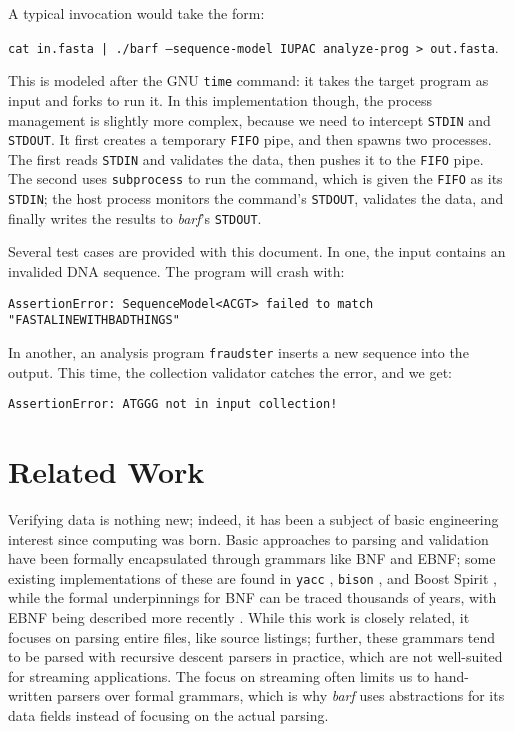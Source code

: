\documentclass[12pt]{article} %
\newcommand{\code}[1]{\texttt{#1}}
\begin{document}
A typical invocation would take the form:

\begin{center}
\code{cat in.fasta | ./barf --sequence-model IUPAC analyze-prog > out.fasta}.
\end{center}

This is modeled after the GNU \texttt{time} command: it takes the target program
as input and forks to run it. In this implementation though, the process management
is slightly more complex, because we need to intercept \texttt{STDIN} and
\texttt{STDOUT}. It first creates a temporary \texttt{FIFO} pipe, and then spawns
two processes. The first reads \texttt{STDIN} and validates the data, then pushes it
to the \texttt{FIFO} pipe. The second uses \texttt{subprocess} to run the command,
which is given the \texttt{FIFO} as its \texttt{STDIN}; the host process monitors
the command's \texttt{STDOUT}, validates the data, and finally writes the results
to \emph{barf}'s \texttt{STDOUT}.

Several test cases are provided with this document. In one, the input contains an
invalided DNA sequence. The program will crash with:

\begin{center}
\code{AssertionError: SequenceModel<ACGT> failed to match "FASTALINEWITHBADTHINGS"}
\end{center}

In another, an analysis program \texttt{fraudster} inserts a new sequence into the
output. This time, the collection validator catches the error, and we get:

\begin{center}
\code{AssertionError: ATGGG not in input collection!}
\end{center}

\section{Related Work}

Verifying data is nothing new; indeed, it has been a subject of basic engineering
interest since computing was born. Basic approaches to parsing and validation
have been formally encapsulated through grammars like BNF and EBNF; some 
existing implementations of these are found in \texttt{yacc} \citep{mason_lex_1990},
\texttt{bison} \citep{_bison_1988}, and Boost Spirit \citep{de_guzman_boost_2009},
while the formal underpinnings for BNF can be traced thousands of years, with EBNF
being described more recently \cite{scowen_extended_1998}. While this work is
closely related, it focuses on parsing entire files, like source listings; further, these
grammars tend to be parsed with recursive descent parsers in practice, which are
not well-suited for streaming applications. The focus on streaming often limits us
to hand-written parsers over formal grammars, which is why \emph{barf} uses 
abstractions for its data fields instead of focusing on the actual parsing.
\end{document}
